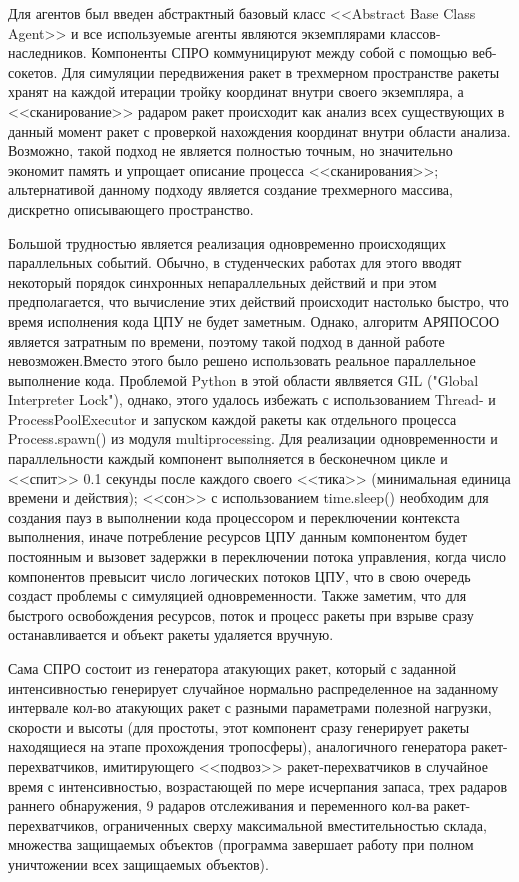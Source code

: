 Для агентов был введен абстрактный базовый класс <<Abstract Base Class Agent>> и  все используемые агенты являются экземплярами классов-наследников. Компоненты СПРО коммуницируют между собой с помощью веб-сокетов. Для симуляции передвижения ракет в трехмерном пространстве ракеты хранят на каждой итерации тройку координат внутри своего экземпляра, а <<сканирование>> радаром ракет происходит как анализ всех существующих в данный момент ракет с проверкой нахождения координат внутри области анализа. Возможно, такой подход не является полностью точным, но значительно экономит память и упрощает описание процесса <<сканирования>>; альтернативой данному подходу является создание трехмерного массива, дискретно описывающего пространство. 


Большой трудностью является реализация  одновременно происходящих параллельных событий. Обычно, в студенческих работах  для этого вводят некоторый порядок синхронных непараллельных действий и при этом предполагается, что вычисление этих действий происходит настолько быстро, что время исполнения кода ЦПУ не будет заметным. Однако, алгоритм АРЯПОСОО является затратным по времени, поэтому такой подход в данной работе невозможен.Вместо этого было решено использовать реальное параллельное выполнение кода. Проблемой Python в этой области явлвяется GIL ("Global Interpreter Lock"), однако, этого удалось избежать с использованием Thread- и ProcessPoolExecutor  и запуском каждой ракеты как отдельного процесса  Process.spawn() из модуля multiprocessing. Для реализации одновременности и параллельности каждый компонент выполняется в бесконечном цикле и <<спит>> 0.1 секунды после каждого своего <<тика>> (минимальная единица времени и действия); <<сон>>  с использованием time.sleep() необходим для создания пауз в выполнении кода процессором и переключении контекста выполнения, иначе  потребление ресурсов ЦПУ данным компонентом будет постоянным и вызовет задержки в переключении потока управления, когда число компонентов превысит число логических потоков ЦПУ, что в свою очередь создаст проблемы с симуляцией одновременности. Также заметим, что для быстрого освобождения ресурсов, поток и процесс ракеты при взрыве сразу останавливается и объект ракеты удаляется вручную.

Сама СПРО состоит из генератора атакующих ракет, который с заданной интенсивностью генерирует случайное нормально распределенное на заданному интервале кол-во атакующих ракет с разными параметрами полезной нагрузки, скорости и высоты (для простоты, этот компонент сразу генерирует ракеты находящиеся на этапе прохождения тропосферы), аналогичного генератора ракет-перехватчиков, имитирующего <<подвоз>>  ракет-перехватчиков в случайное время с интенсивностью, возрастающей по мере исчерпания запаса, трех радаров раннего обнаружения, 9 радаров отслеживания и переменного кол-ва ракет-перехватчиков, ограниченных сверху максимальной вместительностью склада, множества защищаемых объектов (программа завершает работу при полном уничтожении всех защищаемых объектов).

